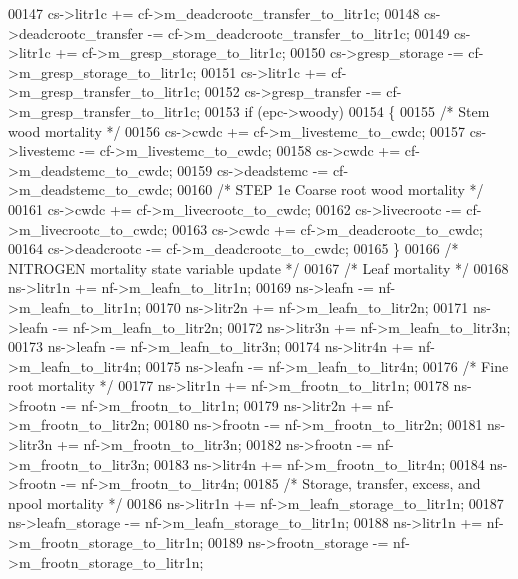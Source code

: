 \begin{DoxyCode}
00147     cs->litr1c              += cf->m\_deadcrootc\_transfer\_to\_litr1c;
00148     cs->deadcrootc\_transfer -= cf->m\_deadcrootc\_transfer\_to\_litr1c;
00149     cs->litr1c              += cf->m\_gresp\_storage\_to\_litr1c;
00150     cs->gresp\_storage       -= cf->m\_gresp\_storage\_to\_litr1c;
00151     cs->litr1c              += cf->m\_gresp\_transfer\_to\_litr1c;
00152     cs->gresp\_transfer      -= cf->m\_gresp\_transfer\_to\_litr1c;
00153     \textcolor{keywordflow}{if} (epc->woody)
00154     \{
00155         \textcolor{comment}{/*    Stem wood mortality */}
00156         cs->cwdc       += cf->m\_livestemc\_to\_cwdc;
00157         cs->livestemc  -= cf->m\_livestemc\_to\_cwdc;
00158         cs->cwdc       += cf->m\_deadstemc\_to\_cwdc;
00159         cs->deadstemc  -= cf->m\_deadstemc\_to\_cwdc;
00160         \textcolor{comment}{/* STEP 1e  Coarse root wood mortality */}
00161         cs->cwdc       += cf->m\_livecrootc\_to\_cwdc;
00162         cs->livecrootc -= cf->m\_livecrootc\_to\_cwdc;
00163         cs->cwdc       += cf->m\_deadcrootc\_to\_cwdc;
00164         cs->deadcrootc -= cf->m\_deadcrootc\_to\_cwdc;
00165     \}
00166     \textcolor{comment}{/* NITROGEN mortality state variable update */}
00167     \textcolor{comment}{/*    Leaf mortality */}
00168     ns->litr1n         += nf->m\_leafn\_to\_litr1n;
00169     ns->leafn          -= nf->m\_leafn\_to\_litr1n;
00170     ns->litr2n         += nf->m\_leafn\_to\_litr2n;
00171     ns->leafn          -= nf->m\_leafn\_to\_litr2n;
00172     ns->litr3n         += nf->m\_leafn\_to\_litr3n;
00173     ns->leafn          -= nf->m\_leafn\_to\_litr3n;
00174     ns->litr4n         += nf->m\_leafn\_to\_litr4n;
00175     ns->leafn          -= nf->m\_leafn\_to\_litr4n;
00176     \textcolor{comment}{/*    Fine root mortality */}
00177     ns->litr1n         += nf->m\_frootn\_to\_litr1n;
00178     ns->frootn         -= nf->m\_frootn\_to\_litr1n;
00179     ns->litr2n         += nf->m\_frootn\_to\_litr2n;
00180     ns->frootn         -= nf->m\_frootn\_to\_litr2n;
00181     ns->litr3n         += nf->m\_frootn\_to\_litr3n;
00182     ns->frootn         -= nf->m\_frootn\_to\_litr3n;
00183     ns->litr4n         += nf->m\_frootn\_to\_litr4n;
00184     ns->frootn         -= nf->m\_frootn\_to\_litr4n;
00185     \textcolor{comment}{/*    Storage, transfer, excess, and npool mortality */}
00186     ns->litr1n              += nf->m\_leafn\_storage\_to\_litr1n;
00187     ns->leafn\_storage       -= nf->m\_leafn\_storage\_to\_litr1n;
00188     ns->litr1n              += nf->m\_frootn\_storage\_to\_litr1n;
00189     ns->frootn\_storage      -= nf->m\_frootn\_storage\_to\_litr1n;

\end{DoxyCode}
